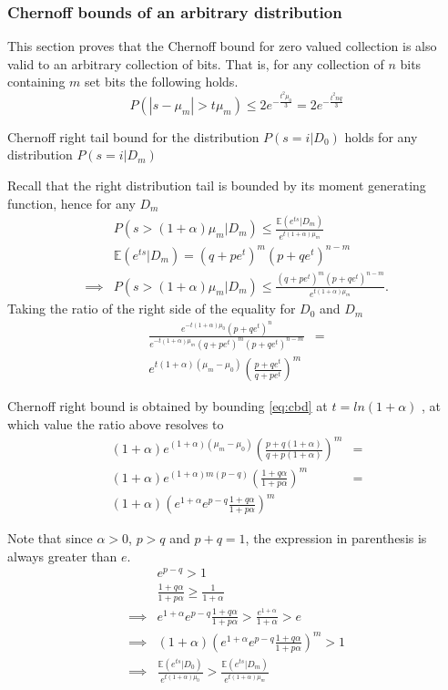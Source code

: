 \documentclass[11pt]{article}
\newcommand{\E}{\mathbb{E}} %
\begin{document}
\subsubsection{Chernoff bounds of an arbitrary distribution }

This section proves that the Chernoff bound for zero valued collection is also valid to an arbitrary collection of bits.  That is, for any collection of $n$ bits containing $m$ set bits the following holds.
\[ P(|s - \mu_m| > t\mu_m) \le 2 e^{- \frac{t^2\mu_0}{3}}  = 2 e^{- \frac{t^2nq}{3}} \]

\begin{prop} \label{lem:zleft}
Chernoff right tail bound for the distribution $P(s=i|D_0)$ holds for any distribution $P(s=i|D_m)$
\begin{pf}
Recall that the right distribution tail is bounded by its moment generating function, hence for any $D_m$
 \begin{align}
& P(s  > (1+\alpha)\mu_m | D_m)  \le \frac{\E(e^{ts}|D_m)}{e^{t(1+\alpha)\mu_m}} \\
 & \E(e^{ts}|D_m) = (q +pe^{t})^m(p+qe^{t})^{n-m} \\
 \implies & P(s  > (1+\alpha)\mu_m | D_m)  \le \frac{ (q +pe^{t})^m(p+qe^{t})^{n-m}}{e^{t(1+\alpha)\mu_m}}. \label{eq:cbd}
 \end{align}
 Taking the ratio of the right side of the equality for $D_0$ and $D_m$
 \begin{align}
  \frac{ e^{-t(1+\alpha)\mu_0} (p+qe^{t})^n }{ e^{-t(1+\alpha)\mu_m} (q +pe^{t})^m(p+qe^{t})^{n-m} } & = \\
  e^{t(1+\alpha)(\mu_m - \mu_0)} \left ( \frac{p+qe^{t} } { q+pe^{t} } \right )^m
\end{align}
 
 Chernoff right bound is obtained by bounding \ref{eq:cbd} at $t=ln(1+\alpha)$ , at which value the ratio above resolves to
  \begin{align*}
 (1+\alpha)e^{(1+\alpha)(\mu_m - \mu_0)} \left ( \frac{p+q(1+\alpha) } { q+p(1+\alpha) } \right )^m & = \\
 (1+\alpha)e^{(1+\alpha)m(p - q)} \left ( \frac{1+q\alpha } { 1+ p\alpha} \right )^m  & = \\
  (1+\alpha) \left ( e^{1+\alpha} e^{p-q} \frac{1+q\alpha } { 1+ p\alpha} \right )^m
 \end{align*}
 
Note that since $\alpha > 0$, $p>q$ and $p+q=1$, the expression in parenthesis is always greater than $e$.
  \begin{align*}
 & e^{p-q} > 1 \\
 & \frac{1+q\alpha } { 1+ p\alpha}  \ge \frac{1} { 1+ \alpha}  \\
 \implies & e^{1+\alpha} e^{p-q} \frac{1+q\alpha } { 1+ p\alpha}  > \frac{ e^{1+\alpha} } { 1 + \alpha}  > e \\
 \implies  & (1+\alpha) \left ( e^{1+\alpha} e^{p-q} \frac{1+q\alpha } { 1+ p\alpha} \right )^m > 1 \\
  \implies & \frac{\E(e^{ts}|D_0)}{e^{t(1+\alpha)\mu_0}} > \frac{\E(e^{ts}|D_m)}{e^{t(1+\alpha)\mu_m}}
  \end{align*}
  

\end{pf}
\end{prop}
\end{document}

